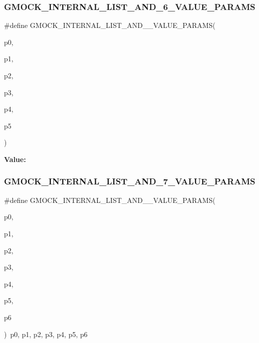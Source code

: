 \subsubsection{\texorpdfstring{GMOCK\_INTERNAL\_LIST\_AND\_6\_VALUE\_PARAMS}{GMOCK\_INTERNAL\_LIST\_AND\_6\_VALUE\_PARAMS}}
{\footnotesize\ttfamily \#define G\+M\+O\+C\+K\+\_\+\+I\+N\+T\+E\+R\+N\+A\+L\+\_\+\+L\+I\+S\+T\+\_\+\+A\+N\+D\+\_\+\_\+\+V\+A\+L\+U\+E\+\_\+\+P\+A\+R\+A\+MS(\begin{DoxyParamCaption}\item[{}]{p0,  }\item[{}]{p1,  }\item[{}]{p2,  }\item[{}]{p3,  }\item[{}]{p4,  }\item[{}]{p5 }\end{DoxyParamCaption})}

{\bfseries Value\+:}
\begin{DoxyCode}{0}

\end{DoxyCode}
\mbox{\label{gmock-generated-actions_8h_a6a66c76963794fca308b7e2852188e06}} 
\subsubsection{\texorpdfstring{GMOCK\_INTERNAL\_LIST\_AND\_7\_VALUE\_PARAMS}{GMOCK\_INTERNAL\_LIST\_AND\_7\_VALUE\_PARAMS}}
{\footnotesize\ttfamily \#define G\+M\+O\+C\+K\+\_\+\+I\+N\+T\+E\+R\+N\+A\+L\+\_\+\+L\+I\+S\+T\+\_\+\+A\+N\+D\+\_\+\_\+\+V\+A\+L\+U\+E\+\_\+\+P\+A\+R\+A\+MS(\begin{DoxyParamCaption}\item[{}]{p0,  }\item[{}]{p1,  }\item[{}]{p2,  }\item[{}]{p3,  }\item[{}]{p4,  }\item[{}]{p5,  }\item[{}]{p6 }\end{DoxyParamCaption})~p0, p1, p2, p3, p4, p5, p6}

